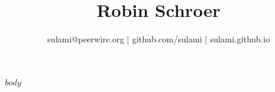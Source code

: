 \documentclass[a4paper,10pt]{scrartcl}
\title{\bfseries Robin Schroer}
\author{sulami@peerwire.org | github.com/sulami | sulami.github.io}
\date{}
\begin{document}
\maketitle

$body$
\end{document}
